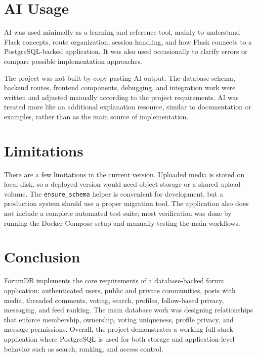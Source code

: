 \documentclass[11pt]{article}
\begin{document}
\section{AI Usage}

AI was used minimally as a learning and reference tool, mainly to understand Flask concepts, route organization, session handling, and how Flask connects to a PostgreSQL-backed application. It was also used occasionally to clarify errors or compare possible implementation approaches.

The project was not built by copy-pasting AI output. The database schema, backend routes, frontend components, debugging, and integration work were written and adjusted manually according to the project requirements. AI was treated more like an additional explanation resource, similar to documentation or examples, rather than as the main source of implementation.

\section{Limitations}

There are a few limitations in the current version. Uploaded media is stored on local disk, so a deployed version would need object storage or a shared upload volume. The \texttt{ensure\_schema} helper is convenient for development, but a production system should use a proper migration tool. The application also does not include a complete automated test suite; most verification was done by running the Docker Compose setup and manually testing the main workflows.

\section{Conclusion}

ForumDB implements the core requirements of a database-backed forum application: authenticated users, public and private communities, posts with media, threaded comments, voting, search, profiles, follow-based privacy, messaging, and feed ranking. The main database work was designing relationships that enforce membership, ownership, voting uniqueness, profile privacy, and message permissions. Overall, the project demonstrates a working full-stack application where PostgreSQL is used for both storage and application-level behavior such as search, ranking, and access control.
\end{document}
